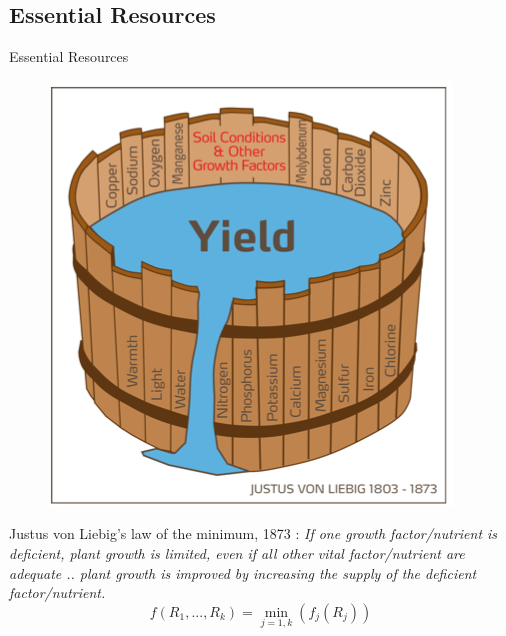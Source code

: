 \documentclass[final,xcolor=dvipsnames]{beamer}
\begin{document}
\subsection{Essential Resources}
\begin{frame}[allowframebreaks]{Essential Resources}

     \begin{figure}
       \includegraphics[width=.3\framewidth]{Barrel}
    \end{figure}
Justus von Liebig's law of the minimum, 1873 : \textit{\small If one growth factor/nutrient is deficient, plant growth is limited, even if all other vital factor/nutrient are adequate .. plant growth is improved by increasing the supply of the deficient factor/nutrient.} 	
    \begin{equation}
f(R_1,...,R_k)=\min\limits_{j=1,k} (f_j(R_j))     
    \end{equation}
    
\framebreak


\end{frame}
\end{document}
